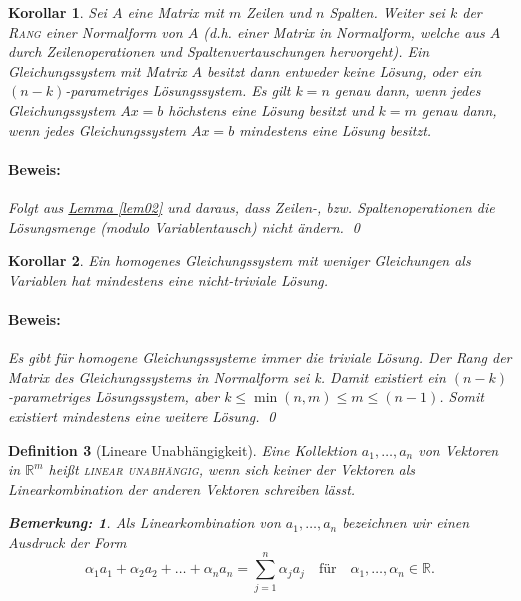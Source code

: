 \documentclass{report}
\newcommand{\IN}[1]{\index{#1|BH}}
\newcommand{\R}{\mathbb{R}}
\newcommand{\al}{\alpha}
\theoremstyle{customrem}
\newtheorem*{bemerkung}{Bemerkung\textnormal:}
\theoremstyle{customdef}
\newtheorem{definition}{Definition}[chapter]
\newtheorem{korrolar}[definition]{Korollar}
\renewenvironment{proof}{\paragraph{Beweis: }}{\qed}
\theoremstyle{customenv}
\newcommand{\defemph}[1]{\textsc{#1}}
\begin{document}
	\begin{korrolar}
		Sei \(A\) eine Matrix mit \(m\) Zeilen und \(n\) Spalten. Weiter sei \(k\) der \defemph{Rang} einer Normalform von \(A\) (d.h. einer Matrix in Normalform, welche aus \(A\) durch Zeilenoperationen und Spaltenvertauschungen hervorgeht). Ein Gleichungssystem  mit Matrix \(A\) besitzt dann entweder keine Lösung, oder ein \((n-k)\)-parametriges Lösungssystem. Es gilt \(k=n\) genau dann, wenn jedes Gleichungssystem \(Ax=b\) \textit{höchstens} eine Lösung besitzt und \(k=m\) genau dann, wenn jedes Gleichungssystem \(Ax=b\) \textit{mindestens} eine Lösung besitzt.\\
		\begin{proof}
			Folgt aus \hyperref[lem02]{Lemma \ref*{lem02}} und daraus, dass Zeilen-, bzw. Spaltenoperationen die Lösungsmenge (modulo Variablentausch) nicht ändern.
		\end{proof}
	\end{korrolar}
	\vspace{.2cm}
	\begin{korrolar}
		\label{kor5}
		Ein homogenes Gleichungssystem mit weniger Gleichungen als Variablen hat mindestens eine nicht-triviale Lösung.
		\begin{proof}
			Es gibt für homogene Gleichungssysteme immer die triviale Lösung. Der Rang der Matrix des Gleichungssystems in Normalform sei k. Damit existiert ein \((n-k)\)-parametriges Lösungssystem, aber \(k \le \min(n, m) \le m \le (n-1)\). Somit existiert mindestens eine weitere Lösung.
		\end{proof}
	\end{korrolar}

	\begin{definition}[Lineare Unabhängigkeit]
		\IN{Lineare Unabhängigkeit}
		\label{deflineareunab}
		Eine Kollektion \(a_1, \dots, a_n\) von Vektoren in \(\R^m\) heißt \defemph{linear unabhängig}, wenn sich keiner der Vektoren als Linearkombination der anderen Vektoren schreiben lässt.\\

		\begin{bemerkung}
			Als Linearkombination von \(a_1, \dots, a_n\) bezeichnen  wir einen Ausdruck der Form \[\al_1a_1 + \al_2 a_2 + \ldots + \al_n a_n = \sum_{j=1}^n \al_j a_j\quad\text{für}\quad\al_1, \dots, \al_n \in \R.\]
		\end{bemerkung}
	\end{definition}
\end{document}
